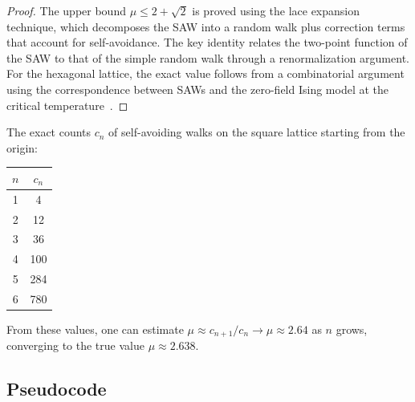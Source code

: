 \begin{proof}
The upper bound $\mu \le 2 + \sqrt{2}$ is proved using the lace expansion technique, which decomposes the SAW into a random walk plus correction terms that account for self-avoidance. The key identity relates the two-point function of the SAW to that of the simple random walk through a renormalization argument. For the hexagonal lattice, the exact value follows from a combinatorial argument using the correspondence between SAWs and the zero-field Ising model at the critical temperature~\cite{madras1996}.
\end{proof}

\begin{example}\label{ex:saw_counts}
The exact counts $c_n$ of self-avoiding walks on the square lattice starting from the origin:
\begin{center}
\begin{tabular}{cc}
\toprule
$n$ & $c_n$ \\
\midrule
1 & 4 \\
2 & 12 \\
3 & 36 \\
4 & 100 \\
5 & 284 \\
6 & 780 \\
\bottomrule
\end{tabular}
\end{center}
From these values, one can estimate $\mu \approx c_{n+1}/c_n \to \mu \approx 2.64$ as $n$ grows, converging to the true value $\mu \approx 2.638$.
\end{example}

\subsection{Pseudocode}

